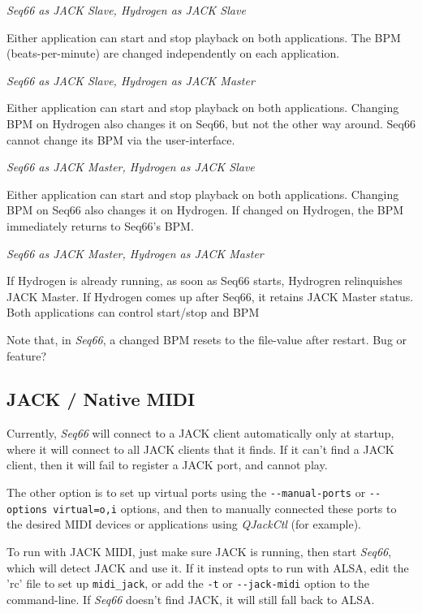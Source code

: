    \textsl{Seq66 as JACK Slave, Hydrogen as JACK Slave}

      Either application can start and stop playback on both applications.
      The BPM (beats-per-minute) are changed independently on each application.

   \textsl{Seq66 as JACK Slave, Hydrogen as JACK Master}

      Either application can start and stop playback on both applications.
      Changing BPM on Hydrogen also changes it on Seq66, but not the other way
      around. Seq66 cannot change its BPM via the user-interface.

   \textsl{Seq66 as JACK Master, Hydrogen as JACK Slave}

      Either application can start and stop playback on both applications.
      Changing BPM on Seq66 also changes it on Hydrogen.  If changed on Hydrogen,
      the BPM immediately returns to Seq66's BPM.

   \textsl{Seq66 as JACK Master, Hydrogen as JACK Master}

      If Hydrogen is already running, as soon as Seq66 starts, Hydrogren
      relinquishes JACK Master.
      If Hydrogen comes up after Seq66, it retains JACK Master status.  Both
      applications can control start/stop and BPM

   Note that, in \textsl{Seq66}, a changed BPM resets to the file-value after
   restart.  Bug or feature?

\subsection{JACK / Native MIDI}
\label{subsec:jack_native_midi}

   Currently, \textsl{Seq66} will connect to a JACK
   client automatically only at startup, where it will connect to all JACK
   clients that it finds.  If it can't find a JACK client, then it will
   fail to register a JACK port, and cannot play.

   The other option is to set up virtual ports using the
   \texttt{-{}-manual-ports} or \texttt{-{}-options virtual=o,i} options, and then
   to manually connected these ports to the desired MIDI devices or
   applications using \textsl{QJackCtl} (for example).

   To run with JACK MIDI, just make sure JACK is running, then start
   \textsl{Seq66}, which will detect JACK and use it.
   If it instead opts to run with ALSA, edit the 'rc' file to set up
   \texttt{midi\_jack}, or add the
   \texttt{-t} or \texttt{-{}-jack-midi}
   option to the command-line.
   If \textsl{Seq66} doesn't find JACK, it will still fall back to ALSA.

